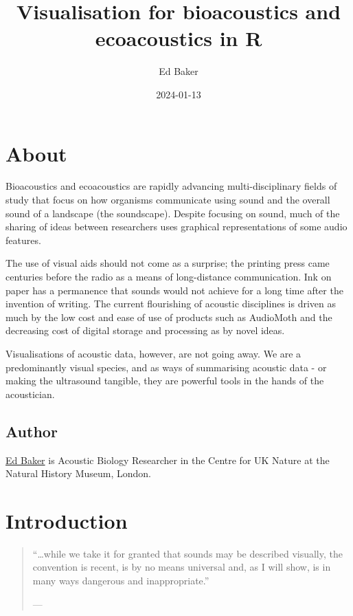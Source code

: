 \documentclass[
]{book}
\title{Visualisation for bioacoustics and ecoacoustics in R}
\author{Ed Baker}
\date{2024-01-13}
\begin{document}
\maketitle

{
\setcounter{tocdepth}{1}
\tableofcontents
}
\hypertarget{about}{%
\chapter*{About}\label{about}}

Bioacoustics and ecoacoustics are rapidly advancing multi-disciplinary fields of study that focus on how organisms communicate using sound and the overall sound of a landscape (the soundscape). Despite focusing on sound, much of the sharing of ideas between researchers uses graphical representations of some audio features.

The use of visual aids should not come as a surprise; the printing press came centuries before the radio as a means of long-distance communication. Ink on paper has a permanence that sounds would not achieve for a long time after the invention of writing. The current flourishing of acoustic disciplines is driven as much by the low cost and ease of use of products such as AudioMoth and the decreasing cost of digital storage and processing as by novel ideas.

Visualisations of acoustic data, however, are not going away. We are a predominantly visual species, and as ways of summarising acoustic data - or making the ultrasound tangible, they are powerful tools in the hands of the acoustician.

\hypertarget{author}{%
\section*{Author}\label{author}}

\href{https://ebaker.me.uk}{Ed Baker} is Acoustic Biology Researcher in the Centre for UK Nature at the Natural History Museum, London.

\hypertarget{intro}{%
\chapter{Introduction}\label{intro}}

\begin{quote}
``\ldots while we take it for granted that sounds may be described visually, the convention is recent, is by no means universal and, as I will show, is in many ways dangerous and inappropriate.''

\hfill --- \citet{schafer1977}
\end{quote}
\end{document}
